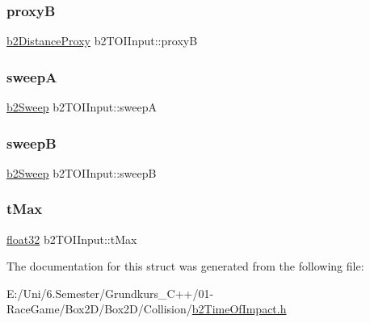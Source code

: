 \mbox{\label{structb2_t_o_i_input_a7f4e614d1c574006402e9610c984a93f}} 
\subsubsection{\texorpdfstring{proxyB}{proxyB}}
{\footnotesize\ttfamily \mbox{\hyperlink{structb2_distance_proxy}{b2\+Distance\+Proxy}} b2\+T\+O\+I\+Input\+::proxyB}

\mbox{\label{structb2_t_o_i_input_adf63a4b9969aa839c2d520bf6d76148a}} 
\subsubsection{\texorpdfstring{sweepA}{sweepA}}
{\footnotesize\ttfamily \mbox{\hyperlink{structb2_sweep}{b2\+Sweep}} b2\+T\+O\+I\+Input\+::sweepA}

\mbox{\label{structb2_t_o_i_input_af506b6adc7eca852f08460ec76c7b9a7}} 
\subsubsection{\texorpdfstring{sweepB}{sweepB}}
{\footnotesize\ttfamily \mbox{\hyperlink{structb2_sweep}{b2\+Sweep}} b2\+T\+O\+I\+Input\+::sweepB}

\mbox{\label{structb2_t_o_i_input_a365a434996de60957777a673918d3a5f}} 
\subsubsection{\texorpdfstring{tMax}{tMax}}
{\footnotesize\ttfamily \mbox{\hyperlink{b2_settings_8h_aacdc525d6f7bddb3ae95d5c311bd06a1}{float32}} b2\+T\+O\+I\+Input\+::t\+Max}



The documentation for this struct was generated from the following file\+:\begin{DoxyCompactItemize}
\item 
E\+:/\+Uni/6.\+Semester/\+Grundkurs\+\_\+\+C++/01-\/\+Race\+Game/\+Box2\+D/\+Box2\+D/\+Collision/\mbox{\hyperlink{b2_time_of_impact_8h}{b2\+Time\+Of\+Impact.\+h}}\end{DoxyCompactItemize}
